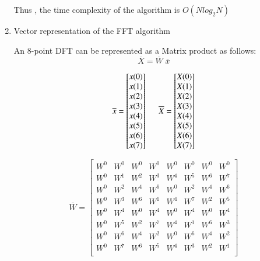 \documentclass[journal,12pt,twocolumn]{IEEEtran}
\renewcommand\thesection{\arabic{section}}
\begin{document}
\begin{enumerate}[label=\thesection.\arabic*.,ref=\thesection.\theenumi]
Thus , the time complexity of the algorithm is $O(Nlog_{2}N)$\bigskip

\item Vector representation of the FFT algorithm

An 8-point DFT can be represented as a Matrix product as follows:
$$\overline{X} = \overline{W}\;  \overline{x}$$

\begin{equation}
  \overline{x} =
\begin{bmatrix}
x(0) \\ x(1) \\ x(2) \\ x(3) \\ x(4) \\ x(5) \\x(6) \\x(7)
\end{bmatrix}  \hspace{5mm} \overline{X} =
\begin{bmatrix}
X(0) \\X(1) \\X(2) \\X(3) \\X(4) \\X(5) \\X(6) \\X(7) \\
\end{bmatrix} 
\end{equation}

\begin{equation}
\overline{W}
=
\begin{bmatrix}
W^{0} & W^{0} & W^{0} & W^{0} & W^{0} & W^{0} & W^{0} & W^{0} \\
W^{0} & W^{1} & W^{2} & W^{3} & W^{4} & W^{5} & W^{6} & W^{7} \\
W^{0} & W^{2} & W^{4} & W^{6} & W^{0} & W^{2} & W^{4} & W^{6} \\
W^{0} & W^{3} & W^{6} & W^{1} & W^{4} & W^{7} & W^{2} & W^{5} \\
W^{0} & W^{4} & W^{0} & W^{4} & W^{0} & W^{4} & W^{0} & W^{4} \\
W^{0} & W^{5} & W^{2} & W^{7} & W^{4} & W^{1} & W^{6} & W^{3} \\
W^{0} & W^{6} & W^{4} & W^{2} & W^{0} & W^{6} & W^{4} & W^{2} \\
W^{0} & W^{7} & W^{6} & W^{5} & W^{4} & W^{3} & W^{2} & W^{1} \\

\end{bmatrix}
\end{equation}


\end{enumerate}
\end{document}
